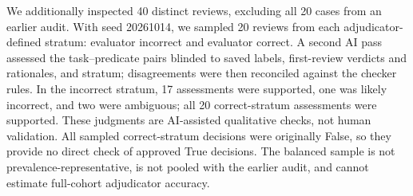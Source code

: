 We additionally inspected 40 distinct reviews, excluding all 20 cases from an earlier audit. With seed 20261014, we sampled 20 reviews from each adjudicator-defined stratum: evaluator incorrect and evaluator correct. A second AI pass assessed the task--predicate pairs blinded to saved labels, first-review verdicts and rationales, and stratum; disagreements were then reconciled against the checker rules. In the incorrect stratum, 17 assessments were supported, one was likely incorrect, and two were ambiguous; all 20 correct-stratum assessments were supported. These judgments are AI-assisted qualitative checks, not human validation. All sampled correct-stratum decisions were originally False, so they provide no direct check of approved True decisions. The balanced sample is not prevalence-representative, is not pooled with the earlier audit, and cannot estimate full-cohort adjudicator accuracy.
